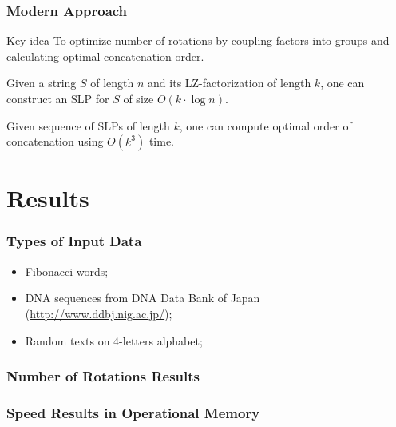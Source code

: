 \documentclass{beamer}
\begin{document}
\begin{frame}
\frametitle{Modern Approach}

\begin{block}{Key idea}
To optimize number of rotations by coupling factors into groups and calculating
optimal concatenation order.
\end{block}

\pause

\begin{theorem}
Given a string $S$ of length $n$ and its LZ-factorization of length $k$, one
can construct an SLP for $S$ of size $O(k \cdot \log n)$.
\end{theorem}

\pause

\begin{lemma}
Given sequence of SLPs of length $k$, one can compute optimal order of
concatenation using $O(k^3)$ time.
\end{lemma}
\end{frame}

\section{Results}

\begin{frame}
\frametitle{Types of Input Data}

\begin{itemize}
  \item Fibonacci words;
  \item DNA sequences from DNA Data Bank of Japan (\url{http://www.ddbj.nig.ac.jp/});
  \item Random texts on 4-letters alphabet; 
\end{itemize}

\end{frame}

\begin{frame}
\frametitle{Number of Rotations Results}

\begin{center}
	\DNARotations
\end{center}
\end{frame}

\begin{frame}
\frametitle{Speed Results in Operational Memory}

\begin{center}
	\DNASpeedTestInMemory
\end{center}
\end{frame}
\end{document}
